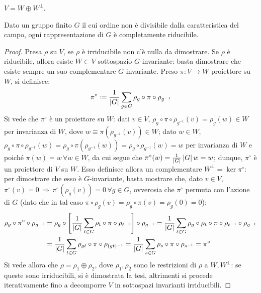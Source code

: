 \begin{propcorollary}
	$ V = W \oplus W^{\perp} $.
\end{propcorollary}

\begin{theorem}[Maschke]\label{th-maschke}
	Dato un gruppo finito $ G $ il cui ordine non è divisibile dalla caratteristica del campo, ogni rappresentazione di $ G $ è completamente riducibile.
\end{theorem}
\begin{proof}
	Presa $ \rho $ su $ V $, se $ \rho $ è irriducibile non c'è nulla da dimostrare.
	Se $ \rho $ è riducibile, allora esiste $ W \subset V $ sottospazio $ G $-invariante: basta dimostrare che esiste sempre un suo complementare $ G $-invariante.
	Preso $ \pi : V \rightarrow W $ proiettore su $ W $, si definisce:
	\begin{equation*}
		\pi^{\circ} \defeq \frac{1}{\abs{G}} \sum_{g \in G} \rho_g \circ \pi \circ \rho_{g^{-1}}
	\end{equation*}
	Si vede che $ \pi^{\circ} $ è un proiettore su $ W $: dati $ v \in V $, $ \rho_g \circ \pi \circ \rho_{g^{-1}} (v) = \rho_g (w) \in W $ per invarianza di $ W $, dove $ w \equiv \pi(\rho_{g^{-1}}(v)) \in W $; dato $ w \in W $, $ \rho_g \circ \pi \circ \rho_{g^{-1}}(w) = \rho_g \circ \pi(\rho_{g^{-1}}(w)) = \rho_g \circ \rho_{g^{-1}}(w) = w $ per invarianza di $ W $ e poiché $ \pi(w) = w \,\forall w \in W $, da cui segue che $ \pi^{\circ}(w) = \frac{1}{\left\lvert G\right\rvert} \left\lvert G\right\rvert w = w $; dunque, $ \pi^{\circ} $ è un proiettore di $ V $ su $ W $. Esso definisce allora un complementare $ W^{\perp} = \ker \pi^{\circ} $: per dimostrare che esso è $ G $-invariante, basta mostrare che, dato $ v \in V $, $ \pi^{\circ}(v) = 0 \,\Rightarrow\, \pi^{\circ}(\rho_g(v)) = 0 \,\forall g \in G $, ovverosia che $ \pi^{\circ} $ permuta con l'azione di $ G $ (dato che in tal caso $ \pi \circ \rho_g (v) = \rho_g \circ \pi(v) = \rho_g (0) = 0 $):
	\begin{equation*}
		\begin{split}
			\rho_g \circ \pi^{\circ} \circ \rho_{g^{-1}} 
			&= \rho_g \circ \left[ \frac{1}{\left\lvert G\right\rvert} \sum_{t \in G} \rho_t \circ \pi \circ \rho_{t^{-1}} \right] \circ \rho_{g^{-1}} = \frac{1}{\left\lvert G\right\rvert} \sum_{t \in G} \rho_g \circ \rho_t \circ \pi \circ \rho_{t^{-1}} \circ \rho_{g^{-1}}\\
			&= \frac{1}{\left\lvert G\right\rvert} \sum_{t \in G} \rho_{gt} \circ \pi \circ \rho_{(gt)^{-1}} = \frac{1}{\left\lvert G\right\rvert} \sum_{s \in G} \rho_s \circ \pi \circ \rho_{s^{-1}} = \pi^{\circ}
		\end{split}
	\end{equation*}
	Si vede allora che $ \rho = \rho_1 \oplus \rho_2 $, dove $ \rho_1,\rho_2 $ sono le restrizioni di $ \rho $ a $ W,W^{\perp} $: se queste sono irriducibili, si è dimostrata la tesi, altrimenti si procede iterativamente fino a decomporre $ V $ in sottospazi invarianti irriducibili.
\end{proof}

